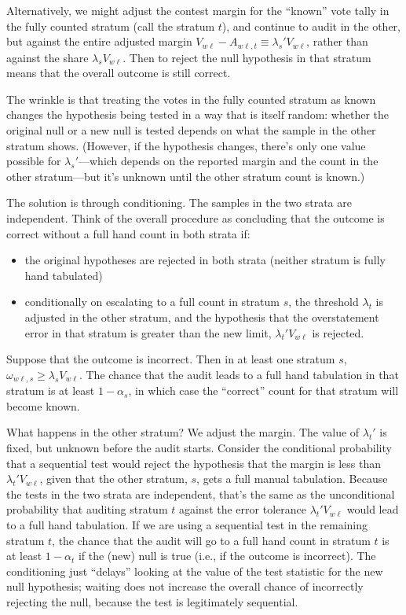 Alternatively, we might adjust the contest margin for the ``known'' vote tally in the
fully counted stratum (call the stratum $t$), and continue to audit in the other, but against the entire adjusted
margin $V_{w\ell} - A_{w\ell,t} \equiv \lambda_s' V_{w\ell}$, rather than 
against the share $\lambda_s V_{w\ell}$.
Then to reject the null hypothesis in that stratum means that the overall outcome is still correct.

The wrinkle is that treating the votes
in the fully counted stratum as known changes the hypothesis being tested in a way that is itself random:
whether the original null or a new null is tested depends on what the sample in the other stratum
shows.
(However, if the hypothesis changes, there's only one value possible for $\lambda_s'$---which
depends on the reported margin and the count in the other stratum---but it's unknown 
until the other stratum count is known.)

The solution is through conditioning. The samples in the two strata are independent. 
Think of the overall procedure as concluding that the outcome is correct without a full
hand count in both strata if:

\begin{itemize}
   \item the original hypotheses are rejected in both strata (neither stratum is fully hand tabulated)
   \item conditionally on escalating to a full count in stratum $s$, the threshold $\lambda_t$
            is adjusted in the other stratum, and the hypothesis that the overstatement error
            in that stratum is greater than the new limit, $\lambda_t' V_{w\ell}$ is rejected. 
\end{itemize}

Suppose that the outcome is incorrect. 
Then in at least one stratum $s$, $\omega_{w\ell,s}\ge \lambda_s V_{w\ell}$.
The chance that the audit leads to a full hand tabulation in that stratum is at least $1-\alpha_s$,
in which case the ``correct'' count for that stratum will become known.

What happens in the other stratum?
We adjust the margin.
The value of $\lambda_t'$ is fixed, but unknown before the audit starts.
Consider the conditional probability that a sequential test would reject the hypothesis that the margin is less than $\lambda_t' V_{w\ell}$, given that the other stratum, $s$, gets a full manual tabulation. 
Because the tests in the two strata are independent, that's the same as the unconditional probability
that auditing stratum $t$ against the error tolerance $\lambda_t' V_{w\ell}$ would lead to a full
hand tabulation. 
If we are using a sequential test in the remaining stratum $t$, the chance that the audit will
go to a full hand count in stratum $t$ is at least $1-\alpha_t$ if the (new) null is true (i.e.,
if the outcome is incorrect). 
The conditioning just ``delays'' looking at the value of the test statistic for the new null hypothesis; waiting does not increase the overall chance of incorrectly rejecting the null, 
because the test is legitimately sequential.

